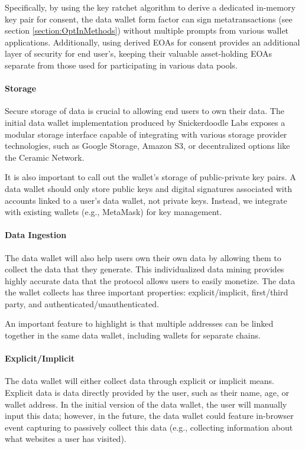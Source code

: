 Specifically, by using the key ratchet algorithm to derive a dedicated in-memory key pair for consent, the data wallet form factor can sign metatransactions (see section \ref{section:OptInMethods}) without multiple prompts from various wallet applications. Additionally, using derived EOAs for consent provides an additional layer of security for end user's, keeping their valuable asset-holding EOAs separate from those
used for participating in various data pools. 

\paragraph{Storage}
\label{section:storage}

Secure storage of data is crucial to allowing end users to own their data. The initial data wallet implementation produced by 
Snickerdoodle Labs exposes a modular storage interface capable of integrating with various storage provider technologies, 
such as Google Storage, Amazon S3, or decentralized options like the Ceramic Network.

It is also important to call out the wallet's storage of public-private key pairs. A data wallet should only store public keys 
and digital signatures associated with accounts linked to a user's data wallet, not private keys. 
Instead, we integrate with existing wallets (e.g., MetaMask) for key management.

\paragraph{Data Ingestion}
\label{section:DataIngestion}
The data wallet will also help users own their own data by allowing them to collect the data that they generate. This individualized data mining 
provides highly accurate data that the protocol allows users to easily monetize. The data the wallet collects has three important properties: 
explicit/implicit, first/third party, and authenticated/unauthenticated. %

An important feature to highlight is that multiple addresses can be linked together in the same data wallet, including wallets for separate chains. 

\paragraph{Explicit/Implicit}
The data wallet will either collect data through explicit or implicit means. Explicit data is data directly provided by the user, such as their name, 
age, or wallet address. In the initial version of the data wallet, the user will manually input this data; however, in the future, the data wallet 
could feature in-browser event capturing to passively collect this data (e.g., collecting information about what websites a user has visited).


